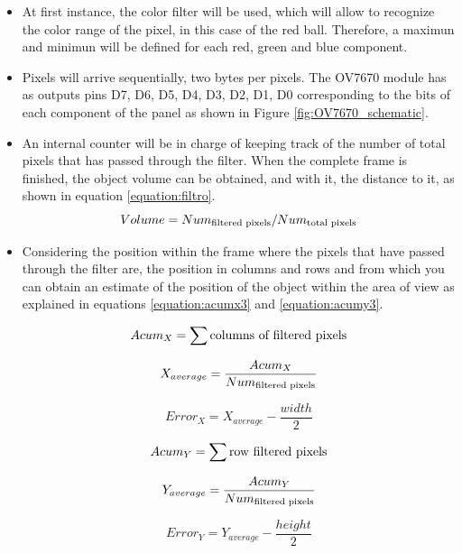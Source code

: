\begin{itemize}
	\item At first instance, the color filter will be used, which will allow to recognize the color range of the pixel, in this case of the red ball. Therefore, a maximun and minimun will be defined for each red, green and blue component.
	\item Pixels will arrive sequentially, two bytes per pixels. The OV7670 module has as outputs pins D7, D6, D5, D4, D3, D2, D1, D0 corresponding to the bits of each component of the panel as shown in Figure \ref{fig:OV7670_schematic}.
	\item An internal counter will be in charge of keeping track of the number of total pixels that has passed through the filter. When the complete frame is finished, the object volume can be obtained, and with it, the distance to it, as shown in equation \ref{equation:filtro}.
	\begin{equation} \label{equation:filtro}
		Volume = Num_{\textup{filtered pixels}}/Num_{\textup{total pixels}}
	\end{equation}
	\item Considering the position within the frame where the pixels that have passed through the filter are, the position in columns and rows and from which you can obtain an estimate of the position of the object within the area of view as explained in equations \ref{equation:acumx3} and \ref{equation:acumy3}.
	
	\begin{equation}\label{equation:acumx}
		Acum_{X} = \sum\textup{columns of filtered pixels}
	\end{equation}
	
	\begin{equation}\label{equation:acumx2}
		X_{average} = \frac{Acum_{X}}{Num_{\textup{filtered pixels}}}
	\end{equation}

	\begin{equation}\label{equation:acumx3}
		Error_{X} = X_{average}- \frac{width}{2}
	\end{equation}
	
	\begin{equation}\label{equation:acumy}
		Acum_{Y} = \sum\textup{row filtered pixels}
 	\end{equation}
	
	\begin{equation}\label{equation:acumy2}
		Y_{average} = \frac{Acum_{Y}}{Num_{\textup{filtered pixels}}}
	\end{equation}
	
	\begin{equation}\label{equation:acumy3}
		Error_{Y} = Y_{average}- \frac{height}{2}
	\end{equation}
	
	\end{itemize}

